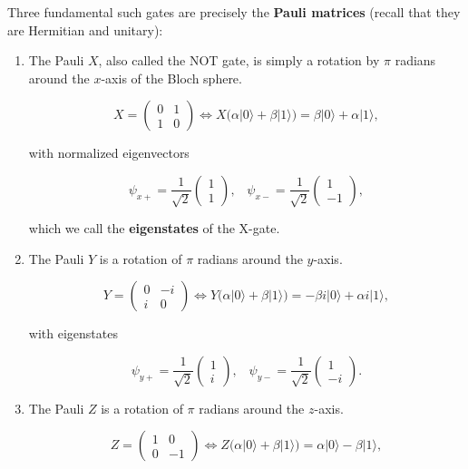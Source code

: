 \documentclass{article}
\theoremstyle{definition}
\begin{document}
    Three fundamental such gates are precisely the \textbf{Pauli matrices} (recall that they are Hermitian and unitary):
    \begin{enumerate}
      \item The Pauli $X$, also called the NOT gate, is simply a rotation by $\pi$ radians around the $x$-axis of the Bloch sphere.

          \[X = \begin{pmatrix} 0 & 1 \\ 1 & 0 \end{pmatrix} \iff X \big(\alpha |0\rangle + \beta |1 \rangle \big) = \beta |0\rangle + \alpha |1\rangle,\]

        with normalized eigenvectors

          \[\psi_{x+} = \frac{1}{\sqrt{2}} \begin{pmatrix} 1 \\ 1 \end{pmatrix}, \;\;\; \psi_{x-} = \frac{1}{\sqrt{2}} \begin{pmatrix} 1 \\ -1 \end{pmatrix},\]

        which we call the \textbf{eigenstates} of the X-gate.

      \item The Pauli $Y$ is a rotation of $\pi$ radians around the $y$-axis.

          \[Y = \begin{pmatrix} 0 & -i \\ i & 0 \end{pmatrix} \iff Y \big( \alpha |0\rangle + \beta |1 \rangle \big) = -\beta i |0\rangle + \alpha i |1 \rangle,\]

        with eigenstates

          \[\psi_{y+} = \frac{1}{\sqrt{2}} \begin{pmatrix} 1 \\ i \end{pmatrix}, \;\;\; \psi_{y-} = \frac{1}{\sqrt{2}} \begin{pmatrix} 1 \\ -i \end{pmatrix}.\]

      \item The Pauli $Z$ is a rotation of $\pi$ radians around the $z$-axis.

          \[Z = \begin{pmatrix} 1 & 0 \\ 0 & -1 \end{pmatrix} \iff Z \big( \alpha |0\rangle + \beta | 1 \rangle \big) = \alpha |0 \rangle - \beta |1 \rangle,\]


\end{enumerate}
\end{document}
